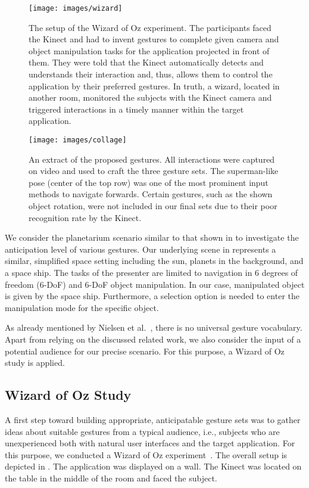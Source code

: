 \documentclass{sigchi}
\begin{document}
\begin{figure}[t]
\centering
\texttt{[image: images/wizard]}
\vskip-1mm
\caption{The setup of the Wizard of Oz experiment. The participants faced the Kinect and had to invent gestures to complete given camera and object manipulation tasks for the application projected in front of them. They were told that the Kinect automatically detects and understands their interaction and, thus, allows them to control the application by their preferred gestures. In truth, a wizard, located in another room, monitored the subjects with the Kinect camera and triggered interactions in a timely manner within the target application.}
\label{fig:oz}
\end{figure}


\begin{figure*}[t]
\centering
\hspace*{-0.2cm} 
\texttt{[image: images/collage]}
\vskip-1mm
\caption{An extract of the proposed gestures. All interactions were captured on video and used to craft the three gesture sets. The superman-like pose (center of the top row) was one of the most prominent input methods to navigate forwards. Certain gestures, such as the shown object rotation, were not included in our final sets due to their poor recognition rate by the Kinect.}
\label{fig:wizard}
\vskip-1mm
\end{figure*}




We consider the planetarium scenario similar to that shown in  to investigate the anticipation level of various gestures. Our underlying scene in  represents a similar, simplified space setting including the sun, planets in the background, and a space ship. The tasks of the presenter are limited to navigation in 6 degrees of freedom (6-DoF) and 6-DoF object manipulation. In our case, manipulated object is given by the space ship. Furthermore, a selection option is needed to enter the manipulation mode for the specific object. 

As already mentioned by Nielsen et al.~\cite{Nielsen03aprocedure}, there is no universal gesture vocabulary. Apart from relying on the discussed related work, we also consider the input of a potential audience for our precise scenario. For this purpose, a Wizard of Oz study is applied.





\subsection{Wizard of Oz Study}
A first step toward building appropriate, anticipatable gesture sets was to gather ideas about suitable gestures from a typical audience, i.e., subjects who are unexperienced both with natural user interfaces and the target application. For this purpose, we conducted a Wizard of Oz experiment~\cite{Althoff2004, Dahlback:1993, Maulsby:1993, Salber:1993}. The overall setup is depicted in . The application was displayed on a wall. The Kinect was located on the table in the middle of the room and faced the subject. 
\end{document}
